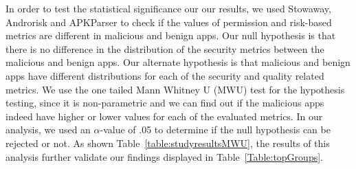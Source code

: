 \documentclass{llncs}
\newcommand{\todo}[1]{\textcolor{cyan}{\textbf{[#1]}}}
\begin{document}
In order to test the statistical significance our our results, we used Stowaway, Androrisk and APKParser to check if the values of permission and risk-based metrics are different in malicious and benign apps. Our null hypothesis is that there is no difference in the distribution of the security metrics between the malicious and benign apps. Our alternate hypothesis is that malicious and benign apps have different distributions for each of the security and quality related metrics. We use the one tailed Mann Whitney U (MWU) test for the hypothesis testing, since it is non-parametric and we can find out if the malicious apps indeed have higher or lower values for each of the evaluated metrics. In our analysis, we used an $\alpha$-value of .05 to determine if the null hypothesis can be rejected or not. As shown Table~\ref{table:studyresultsMWU}, the results of this analysis further validate our findings displayed in Table~\ref{Table:topGroups}.








\end{document}
